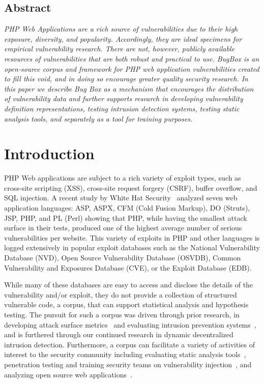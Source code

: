 \documentclass[letterpaper,twocolumn,10pt]{article}
\begin{document}
\subsection*{Abstract}
\textit{
PHP Web Applications are a rich source of vulnerabilities due to their high exposure, diversity, and popularity. Accordingly, they are ideal specimens for empirical vulnerability research. There are not, however, publicly available resources of vulnerabilities that are both robust and practical to use. BugBox is an open-source corpus and framework for PHP web application vulnerabilities created to fill this void, and in doing so encourage greater quality security research. In this paper we describe Bug Box as a mechanism that encourages the distribution of vulnerability data and further supports research in developing vulnerability definition representations, testing intrusion detection systems, testing static analysis tools, and separately as a tool for training purposes.  
}

\section{Introduction}
PHP Web applications are subject to a rich variety of exploit types, such as cross-site scripting (XSS), cross-site request forgery (CSRF), buffer overflow, and SQL injection.  A recent study by White Hat Security~\cite{WhiteHat:2010:Online} analyzed seven web application languages: ASP, ASPX, CFM (Cold Fusion Markup), DO (Struts), JSP, PHP, and PL (Perl) showing that PHP, while having the smallest attack surface in their tests, produced one of the highest average number of serious vulnerabilities per website.  This variety of exploits in PHP and other languages is logged extensively in popular exploit databases such as the National Vulnerability Database (NVD), Open Source Vulnerability Database (OSVDB), Common Vulnerability and Exposures Database (CVE), or the Exploit Database (EDB).\par

While many of these databases are easy to access and disclose the details of the vulnerability and/or exploit, they do not provide a collection of structured vulnerable code, a corpus, that can support statistical analysis and hypothesis testing.  The pursuit for such a corpus was driven through prior research, in developing attack surface metrics~\cite{Stuckman:2012:CAA:2372225.2372229} and evaluating intrusion prevention systems~\cite{Stuckman:2011:TEW:2195220.2195671}, and is furthered through our continued research in dynamic decentralized intrusion detection.  Furthermore, a corpus can facilitate a variety of activities of interest to the security community including evaluating static analysis tools~\cite{Zitser:2004:TSA:1041685.1029911}, penetration testing and training security teams on vulnerability injection~\cite{4725309}, and analyzing open source web applications~\cite{DBLP:journals/ese/HuynhM10}.  \par
\end{document}
